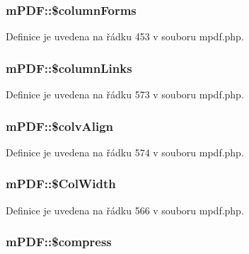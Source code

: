 \hypertarget{classm_p_d_f_aa0a0294e47446dfba61316411010f81f}{
\subsubsection[{\$column\-Forms}]{\setlength{\rightskip}{0pt plus 5cm}m\-P\-D\-F\-::\$column\-Forms}}\label{classm_p_d_f_aa0a0294e47446dfba61316411010f81f}


Definice je uvedena na řádku 453 v souboru mpdf.\-php.

\hypertarget{classm_p_d_f_abc960dbe6def3255555b6f5072913ca0}{
\subsubsection[{\$column\-Links}]{\setlength{\rightskip}{0pt plus 5cm}m\-P\-D\-F\-::\$column\-Links}}\label{classm_p_d_f_abc960dbe6def3255555b6f5072913ca0}


Definice je uvedena na řádku 573 v souboru mpdf.\-php.

\hypertarget{classm_p_d_f_a6cedada26bd3250dc7f8cb423c334ad8}{
\subsubsection[{\$colv\-Align}]{\setlength{\rightskip}{0pt plus 5cm}m\-P\-D\-F\-::\$colv\-Align}}\label{classm_p_d_f_a6cedada26bd3250dc7f8cb423c334ad8}


Definice je uvedena na řádku 574 v souboru mpdf.\-php.

\hypertarget{classm_p_d_f_a47842dc62b6cc8bfb1cff7eeac7d063b}{
\subsubsection[{\$\-Col\-Width}]{\setlength{\rightskip}{0pt plus 5cm}m\-P\-D\-F\-::\$\-Col\-Width}}\label{classm_p_d_f_a47842dc62b6cc8bfb1cff7eeac7d063b}


Definice je uvedena na řádku 566 v souboru mpdf.\-php.

\hypertarget{classm_p_d_f_ac60b8b6b9c2e0b291aa6ec4aa57a302b}{
\subsubsection[{\$compress}]{\setlength{\rightskip}{0pt plus 5cm}m\-P\-D\-F\-::\$compress}}\label{classm_p_d_f_ac60b8b6b9c2e0b291aa6ec4aa57a302b}


